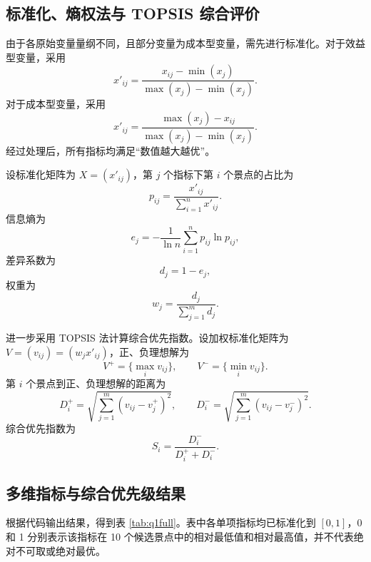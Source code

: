 \documentclass[UTF8,a4paper,12pt]{ctexart}
\begin{document}
\subsection{标准化、熵权法与 TOPSIS 综合评价}

由于各原始变量量纲不同，且部分变量为成本型变量，需先进行标准化。对于效益型变量，采用
\begin{equation}
x'_{ij}=\frac{x_{ij}-\min(x_j)}{\max(x_j)-\min(x_j)}.
\end{equation}
对于成本型变量，采用
\begin{equation}
x'_{ij}=\frac{\max(x_j)-x_{ij}}{\max(x_j)-\min(x_j)}.
\end{equation}
经过处理后，所有指标均满足“数值越大越优”。

设标准化矩阵为 $X=(x'_{ij})$，第 $j$ 个指标下第 $i$ 个景点的占比为
\begin{equation}
p_{ij}=\frac{x'_{ij}}{\sum_{i=1}^{n}x'_{ij}}.
\end{equation}
信息熵为
\begin{equation}
e_j=-\frac{1}{\ln n}\sum_{i=1}^{n}p_{ij}\ln p_{ij},
\end{equation}
差异系数为
\begin{equation}
d_j=1-e_j,
\end{equation}
权重为
\begin{equation}
w_j=\frac{d_j}{\sum_{j=1}^{m}d_j}.
\end{equation}

进一步采用 TOPSIS 法计算综合优先指数。设加权标准化矩阵为 $V=(v_{ij})=(w_jx'_{ij})$，正、负理想解为
\begin{equation}
V^+=\{\max_i v_{ij}\},\qquad V^-=\{\min_i v_{ij}\}.
\end{equation}
第 $i$ 个景点到正、负理想解的距离为
\begin{equation}
D_i^+=\sqrt{\sum_{j=1}^{m}(v_{ij}-v_j^+)^2},\qquad
D_i^-=\sqrt{\sum_{j=1}^{m}(v_{ij}-v_j^-)^2}.
\end{equation}
综合优先指数为
\begin{equation}
S_i=\frac{D_i^-}{D_i^+ + D_i^-}.
\end{equation}

\subsection{多维指标与综合优先级结果}

根据代码输出结果，得到表 \ref{tab:q1full}。表中各单项指标均已标准化到 $[0,1]$，0 和 1 分别表示该指标在 10 个候选景点中的相对最低值和相对最高值，并不代表绝对不可取或绝对最优。
\end{document}
